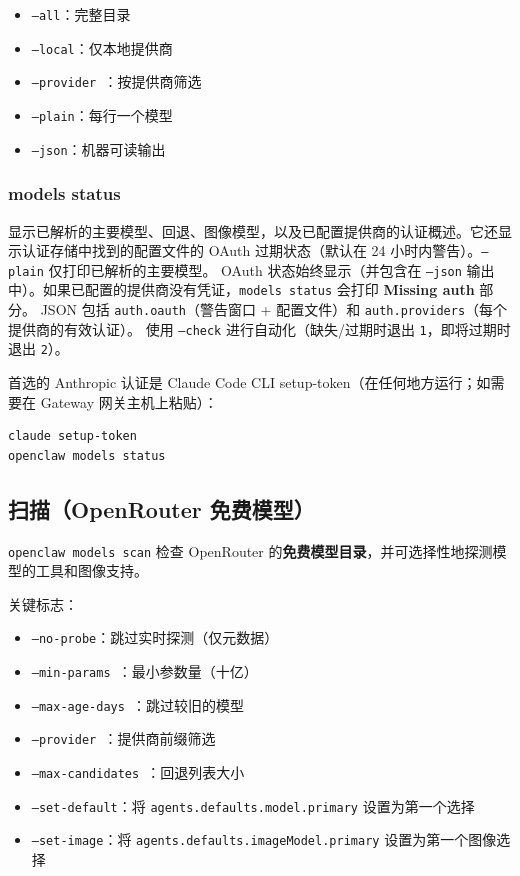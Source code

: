 \begin{itemize}
  \item \texttt{--all}：完整目录
  \item \texttt{--local}：仅本地提供商
  \item \texttt{--provider }：按提供商筛选
  \item \texttt{--plain}：每行一个模型
  \item \texttt{--json}：机器可读输出
\end{itemize}


\subsubsection{models status}


显示已解析的主要模型、回退、图像模型，以及已配置提供商的认证概述。它还显示认证存储中找到的配置文件的 OAuth 过期状态（默认在 24 小时内警告）。\texttt{--plain} 仅打印已解析的主要模型。
OAuth 状态始终显示（并包含在 \texttt{--json} 输出中）。如果已配置的提供商没有凭证，\texttt{models status} 会打印 \textbf{Missing auth} 部分。
JSON 包括 \texttt{auth.oauth}（警告窗口 + 配置文件）和 \texttt{auth.providers}（每个提供商的有效认证）。
使用 \texttt{--check} 进行自动化（缺失/过期时退出 \texttt{1}，即将过期时退出 \texttt{2}）。

首选的 Anthropic 认证是 Claude Code CLI setup-token（在任何地方运行；如需要在 Gateway 网关主机上粘贴）：

\begin{lstlisting}[language=bash]
claude setup-token
openclaw models status
\end{lstlisting}


\subsection{扫描（OpenRouter 免费模型）}


\texttt{openclaw models scan} 检查 OpenRouter 的\textbf{免费模型目录}，并可选择性地探测模型的工具和图像支持。

关键标志：

\begin{itemize}
  \item \texttt{--no-probe}：跳过实时探测（仅元数据）
  \item \texttt{--min-params }：最小参数量（十亿）
  \item \texttt{--max-age-days }：跳过较旧的模型
  \item \texttt{--provider }：提供商前缀筛选
  \item \texttt{--max-candidates }：回退列表大小
  \item \texttt{--set-default}：将 \texttt{agents.defaults.model.primary} 设置为第一个选择
  \item \texttt{--set-image}：将 \texttt{agents.defaults.imageModel.primary} 设置为第一个图像选择
\end{itemize}


